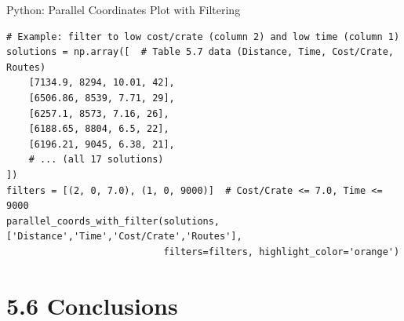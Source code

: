 \documentclass[aspectratio=169,10pt]{beamer}
\begin{document}
\begin{frame}[fragile]{Python: Parallel Coordinates Plot with Filtering}
\begin{lstlisting}[caption={Parallel Coordinates with Filters (Python/matplotlib)}]
# Example: filter to low cost/crate (column 2) and low time (column 1)
solutions = np.array([  # Table 5.7 data (Distance, Time, Cost/Crate, Routes)
    [7134.9, 8294, 10.01, 42],
    [6506.86, 8539, 7.71, 29],
    [6257.1, 8573, 7.16, 26],
    [6188.65, 8804, 6.5, 22],
    [6196.21, 9045, 6.38, 21],
    # ... (all 17 solutions)
])
filters = [(2, 0, 7.0), (1, 0, 9000)]  # Cost/Crate <= 7.0, Time <= 9000
parallel_coords_with_filter(solutions, ['Distance','Time','Cost/Crate','Routes'],
                            filters=filters, highlight_color='orange')
\end{lstlisting}

\end{frame}

\section{5.6 Conclusions}
\end{document}
